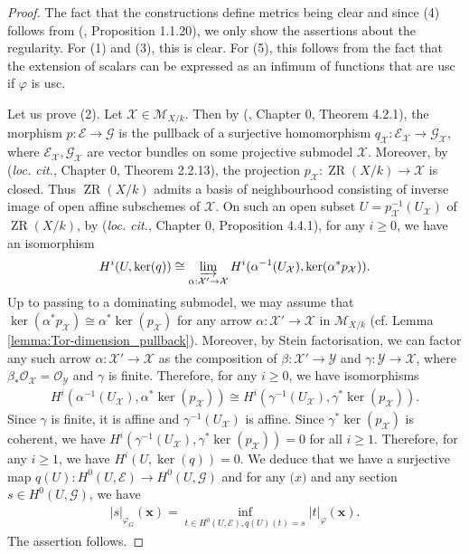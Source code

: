 \documentclass [11pt,reqno]{amsart}
\newcommand{\1}{\mathmybb{1}}
\def\cE{{\mathcal{E}}}
\def\cG{{\mathcal{G}}}
\def\cM{{\mathcal{M}}}
\def\cO{{\mathcal{O}}}
\def\cX{{\mathcal{X}}}
\def\cY{{\mathcal{Y}}}
\def\ZR{\operatorname{ZR}}
\begin{document}
\begin{proof}
The fact that the constructions define metrics being clear and since (4) follows from (\cite{ChenMori}, Proposition 1.1.20), we only show the assertions about the regularity. For (1) and (3), this is clear. For (5), this follows from the fact that the extension of scalars can be expressed as an infimum of functions that are usc if $\varphi$ is usc.

Let us prove (2). Let $\cX\in \cM_{X/k}$. Then by (\cite{Fujiwara-Kato}, Chapter 0, Theorem 4.2.1), the morphism $p:\cE\to\cG$ is the pullback of a surjective homomorphism $q_{\cX}:\cE_{\cX}\to\cG_{\cX}$, where $\cE_{\cX},\cG_{\cX}$ are vector bundles on some projective submodel $\cX$. Moreover, by (\emph{loc. cit.}, Chapter 0, Theorem 2.2.13), the projection $p_{\cX}:\ZR(X/k)\to \cX$ is closed. Thus $\ZR(X/k)$ admits a basis of neighbourhood consisting of inverse image of open affine subschemes of $\cX$. On such an open subset $U=p_{\cX}^{-1}(U_{\cX})$ of $\ZR(X/k)$, by (\emph{loc. cit.}, Chapter 0, Proposition 4.4.1), for any $i\geq 0$, we have an isomorphism
\begin{align*}
H^{i}(U,\ker(q)) \cong \displaystyle\varinjlim_{\alpha:\cX'\to\cX}H^{i}(\alpha^{-1}(U_{\cX}),\ker(\alpha^{\ast}p_{\cX})).
\end{align*} 
Up to passing to a dominating submodel, we may assume that $\ker(\alpha^{\ast}p_{\cX})\cong\alpha^{\ast}\ker(p_{\cX})$ for any arrow $\alpha:\cX'\to\cX$ in $\cM_{X/k}$ (cf. Lemma \ref{lemma:Tor-dimension_pullback}). Moreover, by Stein factorisation, we can factor any such arrow $\alpha:\cX'\to\cX$ as the composition of $\beta:\cX'\to\cY$ and $\gamma:\cY\to \cX$, where $\beta_{\ast}\cO_{\cX}=\cO_{\cY}$ and $\gamma$ is finite. Therefore, for any $i\geq 0$, we have isomorphisms
\begin{align*}
H^{i}(\alpha^{-1}(U_{\cX}),\alpha^{\ast}\ker(p_{\cX})) \cong H^{i}(\gamma^{-1}(U_{\cX}),\gamma^{\ast}\ker(p_{\cX})). 
\end{align*}
Since $\gamma$ is finite, it is affine and $\gamma^{-1}(U_{\cX})$ is affine. Since $\gamma^{\ast}\ker(p_{\cX})$ is coherent, we have $H^{i}(\gamma^{-1}(U_{\cX}),\gamma^{\ast}\ker(p_{\cX}))=0$ for all $i\geq 1$. Therefore, for any $i\geq 1$, we have $H^{i}(U,\ker(q))=0$. We deduce that we have a surjective map $q(U):H^{0}(U,\cE)\to H^{0}(U,\cG)$ and for any $\mathbf(x)$ and any section $s\in H^{0}(U,\cG)$, we have
\begin{align*}
|s|_{\varphi_{G}}(\mathbf{x}) = \displaystyle\inf_{t\in H^{0}(U,\cE), q(U)(t)=s} |t|_{\varphi}(\mathbf{x}).
\end{align*}
The assertion follows. 
\end{proof} 
\end{document}
